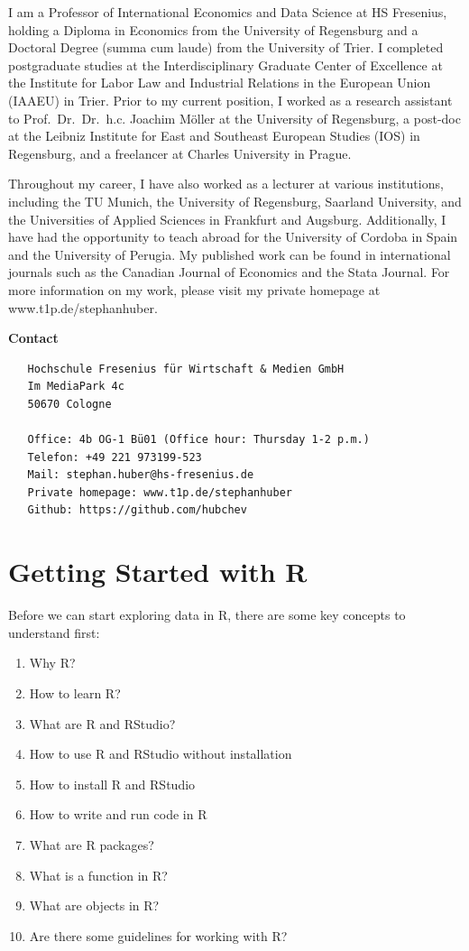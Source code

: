 \documentclass[
  12pt,
  oneside]{book}
\providecommand{\tightlist}{%
  \setlength{\itemsep}{0pt}\setlength{\parskip}{0pt}}
\theoremstyle{definition}
\theoremstyle{definition}
\theoremstyle{definition}
\theoremstyle{definition}
\theoremstyle{remark}
\begin{document}
I am a Professor of International Economics and Data Science at HS Fresenius, holding a Diploma in Economics from the University of Regensburg and a Doctoral Degree (summa cum laude) from the University of Trier. I completed postgraduate studies at the Interdisciplinary Graduate Center of Excellence at the Institute for Labor Law and Industrial Relations in the European Union (IAAEU) in Trier. Prior to my current position, I worked as a research assistant to Prof.~Dr.~Dr.~h.c. Joachim Möller at the University of Regensburg, a post-doc at the Leibniz Institute for East and Southeast European Studies (IOS) in Regensburg, and a freelancer at Charles University in Prague.

Throughout my career, I have also worked as a lecturer at various institutions, including the TU Munich, the University of Regensburg, Saarland University, and the Universities of Applied Sciences in Frankfurt and Augsburg. Additionally, I have had the opportunity to teach abroad for the University of Cordoba in Spain and the University of Perugia. My published work can be found in international journals such as the Canadian Journal of Economics and the Stata Journal. For more information on my work, please visit my private homepage at www.t1p.de/stephanhuber.

\textbf{Contact}

\begin{verbatim}
   Hochschule Fresenius für Wirtschaft & Medien GmbH
   Im MediaPark 4c
   50670 Cologne
   
   Office: 4b OG-1 Bü01 (Office hour: Thursday 1-2 p.m.)
   Telefon: +49 221 973199-523
   Mail: stephan.huber@hs-fresenius.de
   Private homepage: www.t1p.de/stephanhuber
   Github: https://github.com/hubchev
\end{verbatim}

\hypertarget{getting-started}{%
\chapter{Getting Started with R}\label{getting-started}}

Before we can start exploring data in R, there are some key concepts to understand first:

\begin{enumerate}
\def\labelenumi{\arabic{enumi}.}
\tightlist
\item
  Why R?
\item
  How to learn R?
\item
  What are R and RStudio?
\item
  How to use R and RStudio without installation
\item
  How to install R and RStudio
\item
  How to write and run code in R
\item
  What are R packages?
\item
  What is a function in R?
\item
  What are objects in R?
\item
  Are there some guidelines for working with R?
\end{enumerate}
\end{document}
